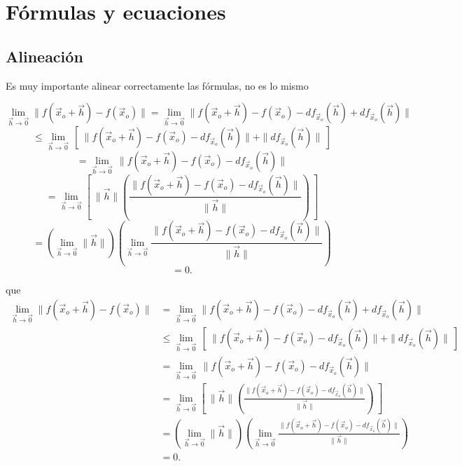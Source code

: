 \chapter{F\'ormulas y ecuaciones}

\section{Alineaci\'on}

Es muy importante alinear correctamente las f\'ormulas, no es lo mismo


$$\lim_{\vec{h} \rightarrow\vec{0}} \| f(\vec{x}_o +\vec{h}) - f(\vec{x}_o) \| = \lim_{\vec{h}
\rightarrow\vec{0}} \| f(\vec{x}_o +\vec{h}) - f(\vec{x}_o) - df_{\vec{x}_o}(\vec{h}) +
df_{\vec{x}_o}(\vec{h}) \|$$
$$ \leq  \lim_{\vec{h} \rightarrow\vec{0}}\,\left[ \:\| f(\vec{x}_o +\vec{h}) - f(\vec{x}_o) -
df_{\vec{x}_o}(\vec{h}) \| + \| df_{\vec{x}_o}(\vec{h}) \|\: \right]$$
$$ =  \lim_{\vec{h} \rightarrow\vec{0}}\,\| f(\vec{x}_o +\vec{h}) - f(\vec{x}_o) -
df_{\vec{x}_o}(\vec{h}) \|$$
$$ = \lim_{\vec{h} \rightarrow\vec{0}}\left[ \: \| \vec{h}\|\left( \frac{\| f(\vec{x}_o
+\vec{h}) - f(\vec{x}_o) - df_{\vec{x}_o}(\vec{h})\| }{\| \vec{h}\| }
 \right)   \:\right]$$
$$= \left( \lim_{\vec{h} \rightarrow\vec{0}}   \| \vec{h}\|\right) \left( \lim_{\vec{h}
\rightarrow\vec{0}} \frac{\| f(\vec{x}_o +\vec{h}) - f(\vec{x}_o) -
df_{\vec{x}_o}(\vec{h})\|}{\| \vec{h}\| }  \right) $$
  $$= 0.$$

que
\begin{align*}
\lim_{\vec{h} \rightarrow\vec{0}} \| f(\vec{x}_o +\vec{h}) - f(\vec{x}_o) \|& = \lim_{\vec{h}
\rightarrow\vec{0}} \| f(\vec{x}_o +\vec{h}) - f(\vec{x}_o) - df_{\vec{x}_o}(\vec{h}) +
df_{\vec{x}_o}(\vec{h}) \|\\
& \leq  \lim_{\vec{h} \rightarrow\vec{0}}\,\left[ \:\| f(\vec{x}_o +\vec{h}) - f(\vec{x}_o) -
df_{\vec{x}_o}(\vec{h}) \| + \| df_{\vec{x}_o}(\vec{h}) \|\: \right]\\
& =  \lim_{\vec{h} \rightarrow\vec{0}}\,\| f(\vec{x}_o +\vec{h}) - f(\vec{x}_o) -
df_{\vec{x}_o}(\vec{h}) \|  \\
& = \lim_{\vec{h} \rightarrow\vec{0}}\left[ \: \| \vec{h}\|\left( \frac{\| f(\vec{x}_o
+\vec{h}) - f(\vec{x}_o) - df_{\vec{x}_o}(\vec{h})\| }{\| \vec{h}\| }
 \right)   \:\right]\\
& = \left( \lim_{\vec{h} \rightarrow\vec{0}}   \| \vec{h}\|\right) \left( \lim_{\vec{h}
\rightarrow\vec{0}} \frac{\| f(\vec{x}_o +\vec{h}) - f(\vec{x}_o) -
df_{\vec{x}_o}(\vec{h})\|}{\| \vec{h}\| }  \right)\\
 & = 0.
\end{align*}

